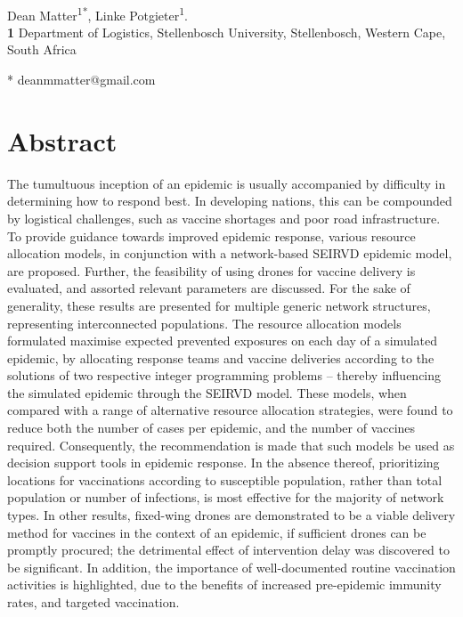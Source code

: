 \documentclass[10pt,letterpaper]{article}
\begin{document}
\vspace*{0.2in}

\begin{flushleft}
{\Large
\textbf{} 
}
\newline
\\
Dean Matter\textsuperscript{1*},
Linke Potgieter\textsuperscript{1}.
\\
\bigskip
\textbf{1} Department of Logistics, Stellenbosch University, Stellenbosch, Western Cape, South Africa
\\
\bigskip

* deanmmatter@gmail.com

\end{flushleft}

\section*{Abstract}
The tumultuous inception of an epidemic is usually accompanied by difficulty in determining how to respond best. In developing nations, this can be compounded by logistical challenges, such as vaccine shortages and poor road infrastructure.
To provide guidance towards improved epidemic response, various resource allocation models, in conjunction with a network-based SEIRVD epidemic model, are proposed. Further, the feasibility of using drones for vaccine delivery is evaluated, and assorted relevant parameters are discussed. For the sake of generality, these results are presented for multiple generic network structures, representing interconnected populations. The resource allocation models formulated maximise expected prevented exposures on each day of a simulated epidemic, by allocating response teams and vaccine deliveries according to the solutions of two respective integer programming problems -- thereby influencing the simulated epidemic through the SEIRVD model. These models, when compared with a range of alternative resource allocation strategies, were found to reduce both the number of cases per epidemic, and the number of vaccines required. Consequently, the recommendation is made that such models be used as decision support tools in epidemic response. In the absence thereof, prioritizing locations for vaccinations according to susceptible population, rather than total population or number of infections, is most effective for the majority of network types. 
In other results, fixed-wing drones are demonstrated to be a viable delivery method for vaccines in the context of an epidemic, if sufficient drones can be promptly procured; the detrimental effect of intervention delay was discovered to be significant. In addition, the importance of well-documented routine vaccination activities is highlighted, due to the benefits of increased pre-epidemic immunity rates, and targeted vaccination.
\end{document}
